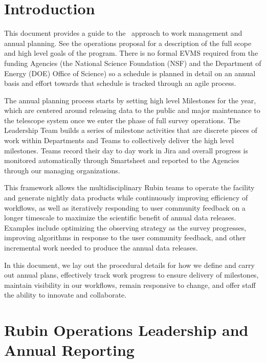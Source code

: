 \section{Introduction}


This document provides a guide to the \VRO\ approach to work management and annual planning.
See the operations proposal  for a description of the full scope and high level goals of the program.
There is no formal \gls{EVMS} required from the funding Agencies (the National Science Foundation (NSF) and the Department of Energy (DOE) Office of Science) so a schedule is planned in detail on an annual basis and effort towards that schedule is tracked through an agile process.

The annual planning process starts by setting high level Milestones for the year, which are centered around releasing data to the public and major maintenance to the telescope system once we enter the phase of full survey operations.   
The Leadership Team builds a series of milestone activities that are discrete pieces of work within Departments and Teams to collectively deliver the high level milestones.  
Teams record their day to day work in Jira and overall progress is monitored automatically through Smartsheet and reported to the Agencies through our managing organizations.

This framework allows the multidisciplinary Rubin teams to operate the facility and generate nightly data products while continuously improving efficiency of workflows,
as well as iteratively responding to user community feedback on a longer timescale to maximize the scientific benefit of annual data releases.
Examples include optimizing the observing strategy as the survey progresses, improving algorithms in response to the user community feedback, 
and other incremental work needed to produce the annual data releases.

In this document, we lay out the procedural details for how we define and carry out annual plans, effectively track work progress to ensure delivery of milestones, maintain visibility in our workflows, remain responsive to change, and offer staff the ability to innovate and collaborate.

\section{Rubin Operations Leadership and Annual Reporting}
\label{sec:contacts}

